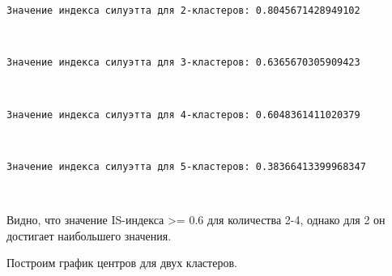 \documentclass[11pt]{article}
\begin{document}
    \begin{Verbatim}[commandchars=\\\{\}]
Значение индекса силуэтта для 2-кластеров: 0.8045671428949102
    \end{Verbatim}

    \begin{center}
    \end{center}
    { \hspace*{\fill} \\}
    \begin{Verbatim}[commandchars=\\\{\}]
Значение индекса силуэтта для 3-кластеров: 0.6365670305909423
    \end{Verbatim}

    \begin{center}
    \end{center}
    { \hspace*{\fill} \\}
    \begin{Verbatim}[commandchars=\\\{\}]
Значение индекса силуэтта для 4-кластеров: 0.6048361411020379
    \end{Verbatim}

    \begin{center}
    \end{center}
    { \hspace*{\fill} \\}
    \begin{Verbatim}[commandchars=\\\{\}]
Значение индекса силуэтта для 5-кластеров: 0.38366413399968347
    \end{Verbatim}

    \begin{center}
    \end{center}
    { \hspace*{\fill} \\}
    
    Видно, что значение IS-индекса \textgreater= 0.6 для количества 2-4,
однако для 2 он достигает наибольшего значения.

Построим график центров для двух кластеров.
\end{document}
